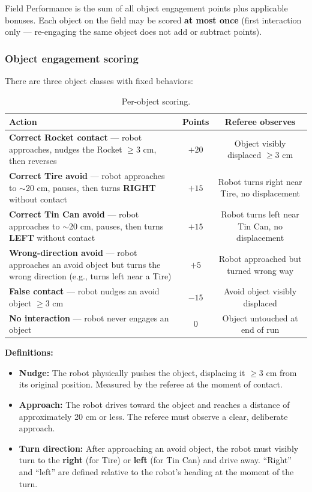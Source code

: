 \documentclass[a4]{article}
\begin{document}
Field Performance is the sum of all object engagement points plus applicable bonuses. Each object on the field may be scored \textbf{at most once} (first interaction only --- re-engaging the same object does not add or subtract points).

\subsubsection*{Object engagement scoring}

There are three object classes with fixed behaviors:

\begin{table}[H]
\centering
\begin{tabular}{p{5.5cm}cc}
\toprule
\textbf{Action} & \textbf{Points} & \textbf{Referee observes} \\
\midrule
\textbf{Correct Rocket contact} --- robot approaches, nudges the Rocket $\geq$3 cm, then reverses & $+20$ & Object visibly displaced $\geq$3 cm \\
\addlinespace
\textbf{Correct Tire avoid} --- robot approaches to $\sim$20 cm, pauses, then turns \textbf{RIGHT} without contact & $+15$ & Robot turns right near Tire, no displacement \\
\addlinespace
\textbf{Correct Tin Can avoid} --- robot approaches to $\sim$20 cm, pauses, then turns \textbf{LEFT} without contact & $+15$ & Robot turns left near Tin Can, no displacement \\
\addlinespace
\textbf{Wrong-direction avoid} --- robot approaches an avoid object but turns the wrong direction (e.g., turns left near a Tire) & $+5$ & Robot approached but turned wrong way \\
\addlinespace
\textbf{False contact} --- robot nudges an avoid object $\geq$3 cm & $-15$ & Avoid object visibly displaced \\
\addlinespace
\textbf{No interaction} --- robot never engages an object & $0$ & Object untouched at end of run \\
\bottomrule
\end{tabular}
\caption{Per-object scoring.}
\end{table}

\textbf{Definitions:}
\begin{itemize}
    \item \textbf{Nudge:} The robot physically pushes the object, displacing it $\geq$3 cm from its original position. Measured by the referee at the moment of contact.
    \item \textbf{Approach:} The robot drives toward the object and reaches a distance of approximately 20 cm or less. The referee must observe a clear, deliberate approach.
    \item \textbf{Turn direction:} After approaching an avoid object, the robot must visibly turn to the \textbf{right} (for Tire) or \textbf{left} (for Tin Can) and drive away. ``Right'' and ``left'' are defined relative to the robot's heading at the moment of the turn.
\end{itemize}
\end{document}
